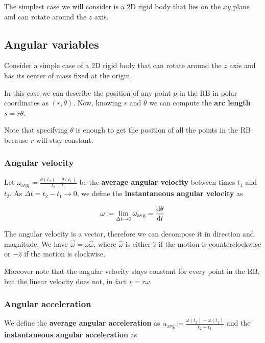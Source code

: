 \documentclass[14pt]{extarticle}
\begin{document}
The simplest case we will consider is a 2D rigid body that lies on the $xy$ plane and can rotate around the $z$ axis.

\subsection{Angular variables}

Consider a simple case of a 2D rigid body that can rotate around the $z$ axis and has its center of mass fixed at the origin.

In this case we can describe the position of any point $p$ in the RB in polar coordinates as $(r, \theta)$. Now, knowing $r$ and $\theta$ we can compute the \textbf{arc length} $s = r\theta$.

Note that specifying $\theta$ is enough to get the position of all the points in the RB because $r$ will stay constant.

\subsubsection{Angular velocity}

Let $\omega_{\text{avg}} \coloneq \frac{\theta(t_2) - \theta(t_1)}{t_2 - t_1}$ be the \textbf{average angular velocity} between times $t_1$ and $t_2$. As $\Delta t = t_2 - t_1 \to 0$, we define the \textbf{instantaneous angular velocity} as

\begin{equation}
    \omega \coloneq \lim_{\Delta t \to 0} \omega_{\text{avg}} = \dv{\theta}{t}
\end{equation}

The angular velocity is a vector, therefore we can decompose it in direction and magnitude. We have $\vec{\omega} = \omega \hat{\omega}$, where $\hat{\omega}$ is either $\hat{z}$ if the motion is counterclockwise or $-\hat{z}$ if the motion is clockwise.

Moreover note that the angular velocity stays constant for every point in the RB, but the linear velocity does not, in fact $v = r\omega$.

\subsubsection{Angular acceleration}

We define the \textbf{average angular acceleration} as $\alpha_{\text{avg}} \coloneq \frac{\omega(t_2) - \omega(t_1)}{t_2 - t_1}$ and the \textbf{instantaneous angular acceleration} as
\end{document}
